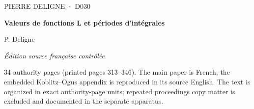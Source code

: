 \documentclass[10pt,twoside]{article}
\begin{document}
\thispagestyle{empty}
\begin{center}
\vspace*{0.16\textheight}
{\sffamily\small\color{D030Accent}PIERRE DELIGNE · D030}\par\vspace{1.2em}
{\Huge\bfseries Valeurs de fonctions L et périodes d’intégrales}\par\vspace{1.1em}
{\Large P. Deligne}\par\vspace{2.1em}
{\large\itshape Édition source française contrôlée}\par\vfill
\begin{minipage}{0.78\textwidth}\small\color{D030Muted}
34 authority pages (printed pages 313--346). The main paper is French; the embedded Koblitz--Ogus appendix is reproduced in its source English.
The text is organized in exact authority-page units; repeated proceedings copy matter is excluded and documented in the separate apparatus.
\end{minipage}
\vspace*{0.10\textheight}
\end{center}
\clearpage
\thispagestyle{plain}
\end{document}

